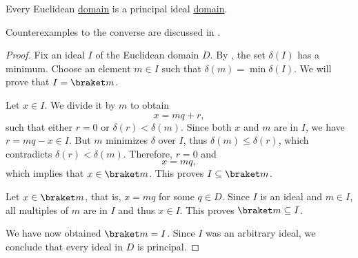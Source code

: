 \begin{proposition}\label{thm:euclidean_domain_is_pid}
  Every Euclidean \hyperref[def:euclidean_domain]{domain} is a principal ideal \hyperref[def:principal_ideal_domain]{domain}.

  Counterexamples to the converse are discussed in \cite{Anderson1988}.
\end{proposition}
\begin{proof}
  Fix an ideal \( I \) of the Euclidean domain \( D \). By , the set \( \delta(I) \) has a minimum. Choose an element \( m \in I \) such that \( \delta(m) = \min \delta(I) \). We will prove that \( I = \braket m \).

  Let \( x \in I \). We divide it by \( m \) to obtain
  \begin{equation*}
    x = mq + r,
  \end{equation*}
  such that either \( r = 0 \) or \( \delta(r) < \delta(m) \). Since both \( x \) and \( m \) are in \( I \), we have \( r = mq - x \in I \). But \( m \) minimizes \( \delta \) over \( I \), thus \( \delta(m) \leq \delta(r) \), which contradicts \( \delta(r) < \delta(m) \). Therefore, \( r = 0 \) and
  \begin{equation*}
    x = mq,
  \end{equation*}
  which implies that \( x \in \braket m \). This proves \( I \subseteq \braket m \).

  Let \( x \in \braket m \), that is, \( x = mq \) for some \( q \in D \). Since \( I \) is an ideal and \( m \in I \), all multiples of \( m \) are in \( I \) and thus \( x \in I \). This proves \( \braket m \subseteq I \).

  We have now obtained \( \braket m = I \). Since \( I \) was an arbitrary ideal, we conclude that every ideal in \( D \) is principal.
\end{proof}

